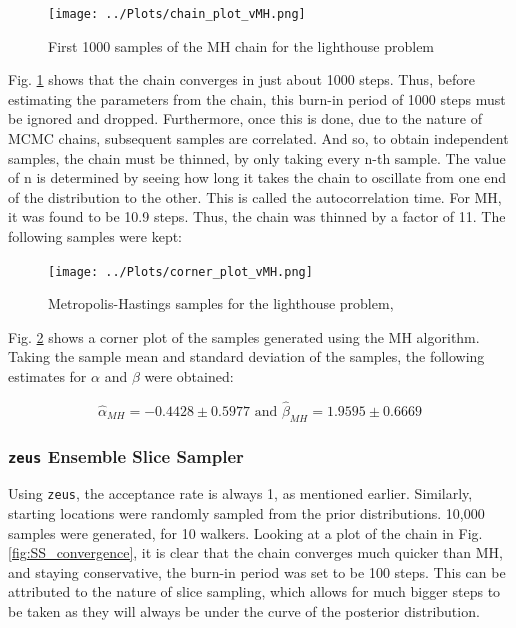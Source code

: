 \documentclass[12pt]{report} %
\begin{document}
\begin{figure}[h]
\centering
\texttt{[image: ../Plots/chain\_plot\_vMH.png]}
\caption{First 1000 samples of the MH chain for the lighthouse problem}
\label{fig:MH_convergence}
\end{figure}

Fig. \ref{fig:MH_convergence} shows that the chain converges in just about 1000 steps. Thus, before estimating the parameters from the chain, this burn-in period of 1000 steps must be ignored and dropped. Furthermore, once this is done, due to the nature of MCMC chains, subsequent samples are correlated. And so, to obtain independent samples, the chain must be thinned, by only taking every n-th sample. The value of n is determined by seeing how long it takes the chain to oscillate from one end of the distribution to the other. This is called the autocorrelation time. For MH, it was found to be 10.9 steps. Thus, the chain was thinned by a factor of 11. The following samples were kept:
\newpage

\begin{figure}[h]
\centering
\texttt{[image: ../Plots/corner\_plot\_vMH.png]}
\caption{Metropolis-Hastings samples for the lighthouse problem, }
\label{fig:MH_samples}
\end{figure}

Fig. \ref{fig:MH_samples} shows a corner plot of the samples generated using the MH algorithm. Taking the sample mean and standard deviation of the samples, the following estimates for $\alpha$ and $\beta$ were obtained:

\begin{equation}
    \hat{\alpha}_{MH} = -0.4428 \pm 0.5977 \text{ and } \hat{\beta}_{MH} = 1.9595 \pm 0.6669
\end{equation}

\subsubsection*{\texttt{zeus} Ensemble Slice Sampler}

Using \texttt{zeus}, the acceptance rate is always 1, as mentioned earlier. Similarly, starting locations were randomly sampled from the prior distributions. 10,000 samples were generated, for 10 walkers. Looking at a plot of the chain in Fig. \ref{fig:SS_convergence}, it is clear that the chain converges much quicker than MH, and staying conservative, the burn-in period was set to be 100 steps. This can be attributed to the nature of slice sampling, which allows for much bigger steps to be taken as they will always be under the curve of the posterior distribution.
\end{document}
